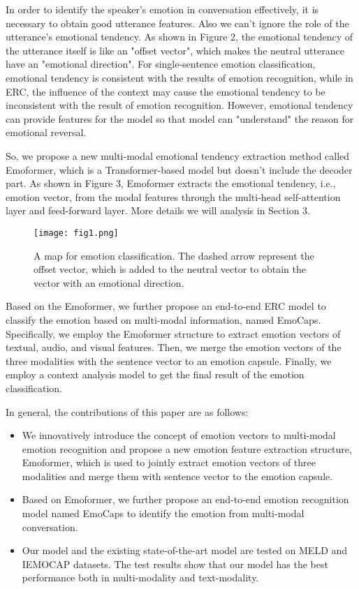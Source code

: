 \documentclass[11pt]{article}
\begin{document}
In order to identify the speaker’s emotion in conversation effectively, it is necessary to obtain good utterance features. Also we can't ignore the role of the utterance’s emotional tendency. As shown in Figure 2, the emotional tendency of the utterance itself is like an "offset vector", which makes the neutral utterance have an "emotional direction". For single-sentence emotion classification, emotional tendency is consistent with the results of emotion recognition, while in ERC, the influence of the context may cause the emotional tendency to be inconsistent with the result of emotion recognition. However, emotional tendency can provide features for the model so that model can "understand" the reason for emotional reversal.

So, we propose a new multi-modal emotional tendency extraction method called Emoformer, which is a Transformer-based model but doesn't include the decoder part. As shown in Figure 3, Emoformer extracts the emotional tendency, i.e., emotion vector, from the modal features through the multi-head self-attention layer and feed-forward layer. More details we will analysis in Section 3.
\begin{figure}[t]
	\centering
	\texttt{[image: fig1.png]} 
	\caption{A map for emotion classification. The dashed arrow represent the offset vector, which is added to the neutral vector to obtain the vector with an emotional direction.}
	\label{fig1}
\end{figure}

Based on the Emoformer, we further propose an end-to-end ERC model to classify the emotion based on multi-modal information, named EmoCaps. Specifically, we employ the Emoformer structure to extract emotion vectors of textual, audio, and visual features. Then, we merge the emotion vectors of the three modalities with the sentence vector to an emotion capsule. Finally, we employ a context analysis model to get the final result of the emotion classification.

In general, the contributions of this paper are as follows:

\begin{itemize}
	
	\item We innovatively introduce the concept of emotion vectors to multi-modal emotion recognition and propose a new emotion feature extraction structure, Emoformer, which is used to jointly extract emotion vectors of three modalities and merge them with sentence vector to the emotion capsule. \item Based on Emoformer, we further propose an end-to-end emotion recognition model named EmoCaps to identify the emotion from multi-modal conversation.  
\item Our model and the existing state-of-the-art model are tested on MELD and IEMOCAP datasets. The test results show that our model has the best performance both in multi-modality and text-modality.
\end{itemize}
\end{document}
